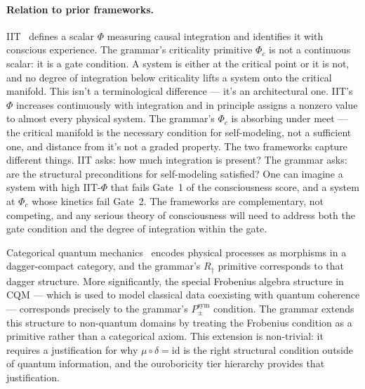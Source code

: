 \documentclass[12pt,a4paper]{article}
\newcommand{\Phic}{\Phi_c}
\newcommand{\Ppms}{P_{\pm}^{\text{sym}}}
\begin{document}
\paragraph{Relation to prior frameworks.}
IIT~\cite{tononi2004,tononi2016} defines a scalar $\Phi$ measuring
causal integration and identifies it with conscious experience. The
grammar's criticality primitive $\Phic$ is not a continuous scalar: it
is a gate condition. A system is either at the critical point or it is
not, and no degree of integration below criticality lifts a system onto
the critical manifold. This isn't a terminological difference --- it's
an architectural one. IIT's $\Phi$ increases continuously with
integration and in principle assigns a nonzero value to almost every
physical system. The grammar's $\Phic$ is absorbing under meet ---
the critical manifold is the necessary condition for self-modeling, not
a sufficient one, and distance from it's not a graded property.
The two frameworks capture different things. IIT asks: how much
integration is present? The grammar asks: are the structural
preconditions for self-modeling satisfied? One can imagine a system
with high IIT-$\Phi$ that fails Gate~1 of the consciousness score, and
a system at $\Phic$ whose kinetics fail Gate~2. The frameworks
are complementary, not competing, and any serious theory of
consciousness will need to address both the gate condition and the
degree of integration within the gate.

Categorical quantum mechanics~\cite{abramsky2004} encodes physical
processes as morphisms in a dagger-compact category, and the grammar's
$R_\dagger$ primitive corresponds to that dagger structure. More
significantly, the special Frobenius algebra structure in CQM ---
which is used to model classical data coexisting with quantum
coherence --- corresponds precisely to the grammar's $\Ppms$ condition.
The grammar extends this structure to non-quantum domains by treating
the Frobenius condition as a primitive rather than a categorical axiom.
This extension is non-trivial: it requires a justification for why
$\mu \circ \delta = \text{id}$ is the right structural condition
outside of quantum information, and the ouroboricity tier hierarchy
provides that justification.
\end{document}
